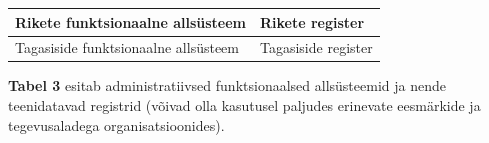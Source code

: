 \documentclass{report}
\begin{document}
\begin{table}[H]
\begin{tabular}{|l|l|}
		Rikete funktsionaalne allsüsteem                                                 & Rikete register                                                                                                                                         \\ \hline
		Tagasiside funktsionaalne allsüsteem                                             & Tagasiside register                                                                                                                                     \\ \hline
	\end{tabular}
\end{table}

\textbf{Tabel 3} esitab administratiivsed funktsionaalsed allsüsteemid ja nende teenidatavad registrid (võivad olla kasutusel paljudes erinevate eesmärkide ja tegevusaladega organisatsioonides).
 
\end{document}
